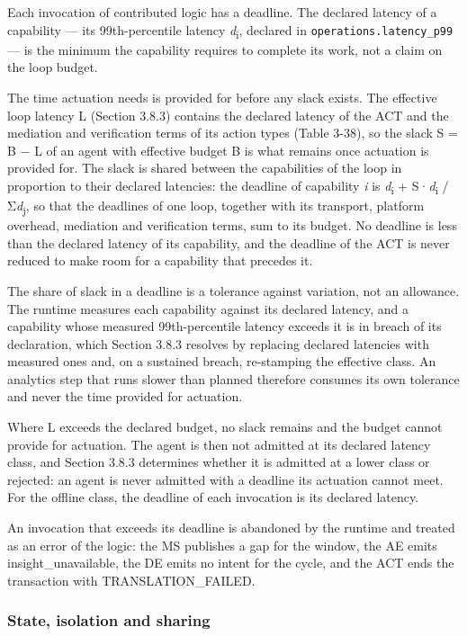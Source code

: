 Each invocation of contributed logic has a deadline. The declared
latency of a capability --- its 99th-percentile latency
\emph{d}\textsubscript{i}, declared in \texttt{operations.latency\_\allowbreak{}p99}
--- is the minimum the capability requires to complete its work, not a
claim on the loop budget.

The time actuation needs is provided for before any slack exists. The
effective loop latency L (Section 3.8.3) contains the declared latency
of the ACT and the mediation and verification terms of its action types
(Table 3-38), so the slack S = B − L of an agent with effective budget B
is what remains once actuation is provided for. The slack is shared
between the capabilities of the loop in proportion to their declared
latencies: the deadline of capability \emph{i} is
\emph{d}\textsubscript{i} + S·\emph{d}\textsubscript{i} /
Σ\emph{d}\textsubscript{j}, so that the deadlines of one loop, together
with its transport, platform overhead, mediation and verification terms,
sum to its budget. No deadline is less than the declared latency of its
capability, and the deadline of the ACT is never reduced to make room
for a capability that precedes it.

The share of slack in a deadline is a tolerance against variation, not
an allowance. The runtime measures each capability against its declared
latency, and a capability whose measured 99th-percentile latency exceeds
it is in breach of its declaration, which Section 3.8.3 resolves by
replacing declared latencies with measured ones and, on a sustained
breach, re-stamping the effective class. An analytics step that runs
slower than planned therefore consumes its own tolerance and never the
time provided for actuation.

Where L exceeds the declared budget, no slack remains and the budget
cannot provide for actuation. The agent is then not admitted at its
declared latency class, and Section 3.8.3 determines whether it is
admitted at a lower class or rejected: an agent is never admitted with a
deadline its actuation cannot meet. For the offline class, the deadline
of each invocation is its declared latency.

An invocation that exceeds its deadline is abandoned by the runtime and
treated as an error of the logic: the MS publishes a gap for the window,
the AE emits insight\_\allowbreak{}unavailable, the DE emits no intent
for the cycle, and the ACT ends the transaction with
TRANSLATION\_\allowbreak{}FAILED.\allowbreak{}

\hypertarget{state-isolation-and-sharing}{%
\subsubsection{State, isolation and sharing}\label{state-isolation-and-sharing}}

